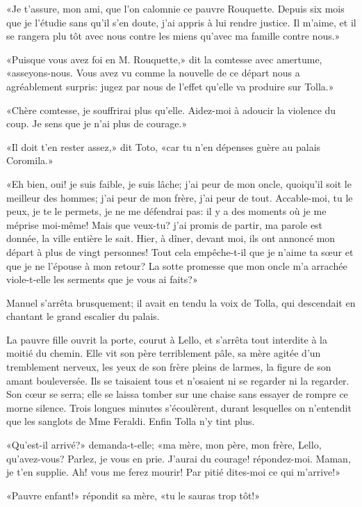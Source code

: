 «Je t'assure, mon ami, que l'on calomnie ce pauvre Rouquette. Depuis six
mois que je l'étudie sans qu'il s'en doute, j'ai appris à lui rendre
justice. Il m'aime, et il se rangera plu tôt avec nous contre les miens
qu'avec ma famille contre nous.»

«Puisque vous avez foi en M. Rouquette,» dit la comtesse avec amertume,
«asseyons-nous. Vous avez vu comme la nouvelle de ce départ nous a
agréablement surpris: jugez par nous de l'effet qu'elle va produire sur
Tolla.»

«Chère comtesse, je souffrirai plus qu'elle. Aidez-moi à adoucir la
violence du coup. Je sens que je n'ai plus de courage.»

«Il doit t'en rester assez,» dit Toto, «car tu n'en dépenses guère au
palais Coromila.»

«Eh bien, oui! je suis faible, je suis lâche; j'ai peur de mon oncle,
quoiqu'il soit le meilleur des hommes; j'ai peur de mon frère, j'ai peur
de tout. Accable-moi, tu le peux, je te le permets, je ne me défendrai
pas: il y a des moments où je me méprise moi-même! Mais que veux-tu?
j'ai promis de partir, ma parole est donnée, la ville entière le sait.
Hier, à dîner, devant moi, ils ont annoncé mon départ à plus de vingt
personnes! Tout cela empêche-t-il que je n'aime ta sœur et que je ne
l'épouse à mon retour? La sotte promesse que mon oncle m'a arrachée
viole-t-elle les serments que je vous ai faits?»

Manuel s'arrêta brusquement; il avait en tendu la voix de Tolla, qui
descendait en chantant le grand escalier du palais.

La pauvre fille ouvrit la porte, courut à Lello, et s'arrêta tout
interdite à la moitié du chemin. Elle vit son père terriblement pâle, sa
mère agitée d'un tremblement nerveux, les yeux de son frère pleins de
larmes, la figure de son amant bouleversée. Ils se taisaient tous et
n'osaient ni se regarder ni la regarder. Son cœur se serra; elle se
laissa tomber sur une chaise sans essayer de rompre ce morne silence.
Trois longues minutes s'écoulèrent, durant lesquelles on n'entendit que
les sanglots de Mme Feraldi. Enfin Tolla n'y tint plus.

«Qu'est-il arrivé?» demanda-t-elle; «ma mère, mon père, mon frère,
Lello, qu'avez-vous? Parlez, je vous en prie. J'aurai du courage!
répondez-moi. Maman, je t'en supplie. Ah! vous me ferez mourir! Par
pitié dites-moi ce qui m'arrive!»

«Pauvre enfant!» répondit sa mère, «tu le sauras trop tôt!»

